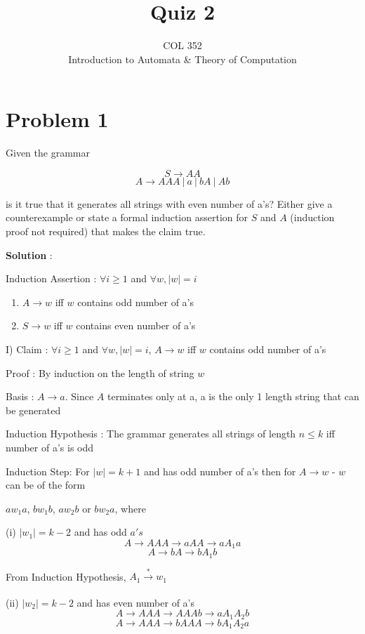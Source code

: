 \documentclass{article}
\title{Quiz 2}
\author{COL 352\\
    Introduction to Automata \& 
    Theory of Computation}
\date{}
\begin{document}
    \maketitle
    
    \section*{Problem 1} Given the grammar 
    
    $$S \rightarrow AA$$
    $$A \rightarrow AAA~|~a~|~bA~|~Ab$$
    
    is it true that it generates all strings with even number of a's? Either give a counterexample or state a formal induction assertion for $S$ and $A$ (induction proof not required) that makes the claim true.
    
    
    \textbf{Solution} :
    
    
    Induction Assertion : $\forall i \geq 1$ and $\forall w, |w| = i$
    \begin{enumerate}
        \item $A \rightarrow w$ iff $w$ contains odd number of a's
        \item $S \rightarrow w$ iff $w$ contains even number of a's
    \end{enumerate}

    I) Claim : $\forall i \geq 1$ and $\forall w, |w| = i$, $A \rightarrow w$ iff $w$ contains odd number of a's
    
    \quad Proof : By induction on the length of string $w$
    
    \quad Basis :   $A \rightarrow a $. Since $A$ terminates only at a, a is the only 1 length string that can be generated
    
    \quad Induction Hypothesis : The grammar generates all strings of length $n \le k$ iff number of a's is odd
    
    \quad Induction Step: For $|w| = k+1$ and has odd number of a's then for $A \rightarrow w$ - $w$ can be of the form 
    
    \quad $aw_{1}a$, $bw_{1}b$, $aw_{2}b$ or $bw_{2}a$, where
    
    \qquad (i) $|w_{1}| = k-2$ and has odd $a's$
    $$A \rightarrow AAA \rightarrow aAA \rightarrow aA_{1}a$$
    $$A \rightarrow bA \rightarrow bA_{1}b$$
    
    \qquad From Induction Hypothesis, $A_{1} \xrightarrow[]{*} w_{1}$
    
    
    \qquad (ii) $|w_{2}| = k-2$ and has even number of a's
    $$A \rightarrow AAA \rightarrow AAAb \rightarrow aA_{1}A_{2}b$$
    $$A \rightarrow AAA \rightarrow bAAA \rightarrow bA_{1}A_{2}a$$
    
\end{document}
